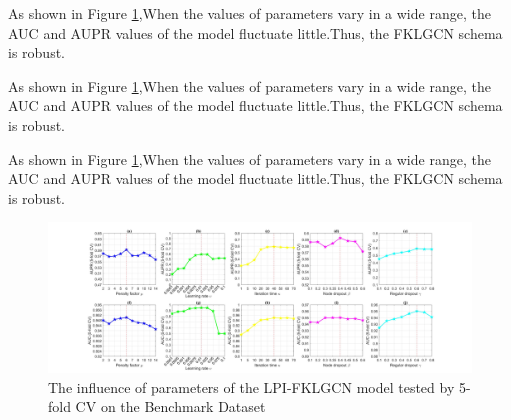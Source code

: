 \documentclass[fleqn,10pt]{wlscirep}
\begin{document}
As shown in Figure \ref{fig:fig2-1},When the values of parameters vary in a wide range, the AUC and AUPR values of the model fluctuate little.Thus, the FKLGCN schema is robust.


As shown in Figure \ref{fig:fig2-1},When the values of parameters vary in a wide range, the AUC and AUPR values of the model fluctuate little.Thus, the FKLGCN schema is robust.


As shown in Figure \ref{fig:fig2-1},When the values of parameters vary in a wide range, the AUC and AUPR values of the model fluctuate little.Thus, the FKLGCN schema is robust.

\begin{figure}[ht]
\centering
\graphicspath{ {./images/} }
\includegraphics[width=\textwidth]{fig1.jpg}
\caption{The influence of parameters of the LPI-FKLGCN model tested by 5-fold CV on the Benchmark Dataset}
\label{fig:fig2-1}
\end{figure}

\end{document}
